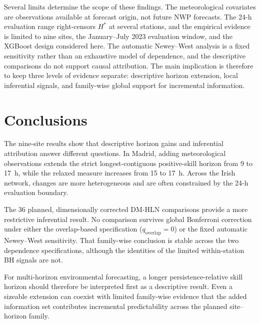 \documentclass[pdflatex,sn-basic,iicol]{sn-jnl}
\begin{document}
Several limits determine the scope of these findings. The meteorological
covariates are observations available at forecast origin, not future NWP
forecasts. The 24-h evaluation range right-censors $H^*$ at several stations,
and the empirical evidence is limited to nine sites, the January--July 2023
evaluation window, and the XGBoost design considered here. The automatic
Newey--West analysis is a fixed sensitivity rather than an exhaustive model
of dependence, and the descriptive comparisons do not support causal
attribution. The main implication is therefore to keep three levels of
evidence separate: descriptive horizon extension, local inferential signals,
and family-wise global support for incremental information.

\section{Conclusions}
\label{sec:conclusions}

The nine-site results show that descriptive horizon gains and inferential
attribution answer different questions. In Madrid, adding meteorological
observations extends the strict longest-contiguous positive-skill horizon
from 9 to 17~h, while the relaxed measure increases from 15 to 17~h. Across
the Irish network, changes are more heterogeneous and are often constrained
by the 24-h evaluation boundary.

The 36 planned, dimensionally corrected DM-HLN comparisons provide a more
restrictive inferential result. No comparison survives global Bonferroni
correction under either the overlap-based specification
($q_{\text{overlap}}=0$) or the fixed automatic Newey--West sensitivity.
That family-wise conclusion is stable across the two dependence
specifications, although the identities of the limited within-station BH
signals are not.

For multi-horizon environmental forecasting, a longer
persistence-relative skill horizon should therefore be interpreted first as
a descriptive result. Even a sizeable extension can coexist with limited
family-wise evidence that the added information set contributes incremental
predictability across the planned site--horizon family.

\FloatBarrier
\end{document}
